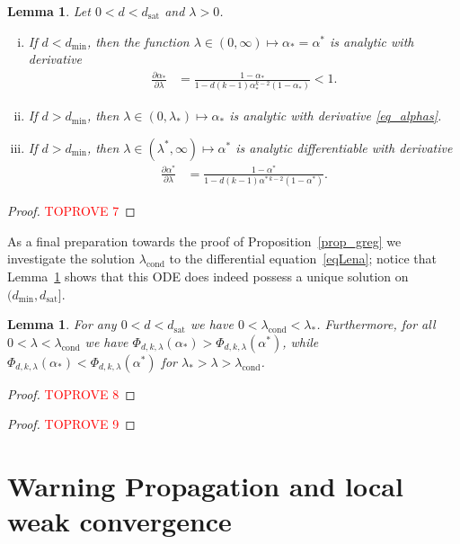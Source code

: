 \documentclass[10pt,reqno]{amsart}
\numberwithin{equation}{section}
\newcommand\dmin{d_{\mathrm{min}}}
\newcommand\dsat{d_{\mathrm{sat}}}
\newcommand{\lcond}{\lambda_{\mathrm{cond}}}
\newcommand\Lem{Lemma}
\newcommand\Prop{Proposition}
\newtheorem{lemma}[definition]{Lemma}
\begin{document}
\begin{lemma}\label{lem_alphas}
	Let $0<d<\dsat$ and $\lambda>0$.
	\begin{enumerate}[(i)]
		\item If $d<\dmin$, then the function $\lambda\in(0,\infty)\mapsto\alpha_*=\alpha^*$ is analytic with derivative
		\begin{align}\label{eq_alphas}
	\frac{\partial\alpha_*}{\partial \lambda}&=\frac{1- \alpha_*}{1-d(k-1)\alpha_*^{k-2}(1-\alpha_*)}<1.
	\end{align}
		\item If $d>\dmin$, then $\lambda\in(0,\lambda_*)\mapsto\alpha_*$ is analytic with derivative \eqref{eq_alphas}.
\item If $d>\dmin$, then $\lambda\in(\lambda^*,\infty)\mapsto\alpha^*$ is analytic differentiable with derivative
\begin{align*}
	\frac{\partial\alpha^*}{\partial \lambda}&=\frac{1- \alpha^*}{1-d(k-1)\alpha^{*\,k-2}(1-\alpha^*)}.
	\end{align*}
	\end{enumerate}
\end{lemma}
\begin{proof}\textcolor{red}{TOPROVE 7}\end{proof}

As a final preparation towards the proof of \Prop~\ref{prop_greg} we investigate the solution $\lcond$ to the differential equation~\eqref{eqLena}; notice that \Lem~\ref{lem_alphas} shows that this ODE does indeed possess a unique solution on $(\dmin,\dsat]$.

\begin{lemma}\label{lem_maxPhi}
	For any $0<d<\dsat$ we have $0<\lcond<\lambda_*$.
	Furthermore, for all $0<\lambda<\lcond$ we have $\Phi_{d,k,\lambda}(\alpha_*)>\Phi_{d,k,\lambda}(\alpha^*)$, while $\Phi_{d,k,\lambda}(\alpha_*)<\Phi_{d,k,\lambda}(\alpha^*)$ for $\lambda_*>\lambda>\lcond$. 
\end{lemma}
\begin{proof}\textcolor{red}{TOPROVE 8}\end{proof}

\begin{proof}\textcolor{red}{TOPROVE 9}\end{proof}


\section{Warning Propagation and local weak convergence}\label{sec_prop_WP}
\end{document}
